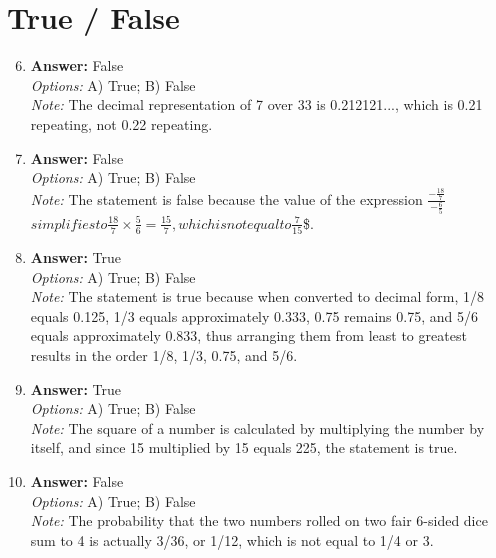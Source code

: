 \documentclass[12pt]{article}
\begin{document}
\section*{True / False}
\begin{enumerate}[label=\arabic*.]
\setcounter{enumi}{5}
\item \textbf{Answer:} False
\\ \textit{Options:} A) True; B) False
\\ \textit{Note:} The decimal representation of 7 over 33 is 0.212121..., which is 0.21 repeating, not 0.22 repeating.
\item \textbf{Answer:} False
\\ \textit{Options:} A) True; B) False
\\ \textit{Note:} The statement is false because the value of the expression $\frac{-\frac{18}{7}}{-\frac{6}{5}}$$ simplifies to $$\frac{18}{7} \times \frac{5}{6} = \frac{15}{7}$$, which is not equal to $$\frac{7}{15}$\$.
\item \textbf{Answer:} True
\\ \textit{Options:} A) True; B) False
\\ \textit{Note:} The statement is true because when converted to decimal form, 1/8 equals 0.125, 1/3 equals approximately 0.333, 0.75 remains 0.75, and 5/6 equals approximately 0.833, thus arranging them from least to greatest results in the order 1/8, 1/3, 0.75, and 5/6.
\item \textbf{Answer:} True
\\ \textit{Options:} A) True; B) False
\\ \textit{Note:} The square of a number is calculated by multiplying the number by itself, and since 15 multiplied by 15 equals 225, the statement is true.
\item \textbf{Answer:} False
\\ \textit{Options:} A) True; B) False
\\ \textit{Note:} The probability that the two numbers rolled on two fair 6-sided dice sum to 4 is actually 3/36, or 1/12, which is not equal to 1/4 or 3.
\end{enumerate}
\end{document}
